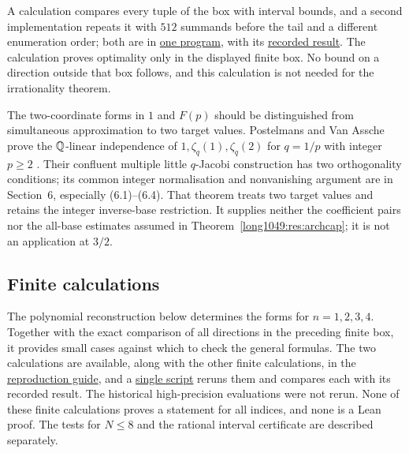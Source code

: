 \documentclass[11pt]{article}
\begin{document}
A calculation compares every tuple of the box with interval bounds,
and a second implementation repeats it with $512$ summands before the
tail and a different enumeration order; both are in
\href{https://github.com/wcook04/plectis-erdos/blob/4beca4ad0c00a626def9c73f2420e20ebf8d1968/research/experiments/erdos1049/parameter_box.py}{one program}, with its \href{https://github.com/wcook04/plectis-erdos/blob/4beca4ad0c00a626def9c73f2420e20ebf8d1968/research/experiments/erdos1049/receipts/parameter-box.json}{recorded result}.
The calculation proves optimality only in the displayed finite box. No
bound on a direction outside that box follows, and this calculation
is not needed for the irrationality theorem.

The two-coordinate forms in $1$ and $F(p)$ should be distinguished
from simultaneous approximation to two target values. Postelmans and Van Assche prove the $\mathbb{Q}$-linear independence
of $1,\zeta_q(1),\zeta_q(2)$ for $q=1/p$ with integer $p\ge2$
\cite[Thm.~1.3, p.~3]{postelmansvanassche2007}.
Their confluent multiple little $q$-Jacobi construction has two
orthogonality conditions; its common integer normalisation and
nonvanishing argument are in Section~6, especially (6.1)--(6.4).
That theorem treats two target values and retains the integer
inverse-base restriction. It supplies neither the coefficient pairs
nor the all-base estimates assumed in Theorem~\ref{long1049:res:archcap};
it is not an application at $3/2$.

\subsection{Finite calculations}\label{long1049:sec:receipts}

The polynomial reconstruction below determines the forms for
$n=1,2,3,4$. Together with the exact comparison of all directions in
the preceding finite box, it provides small cases against which to
check the general formulas. The two calculations are available,
along with the other finite calculations, in the
\href{https://github.com/wcook04/plectis-erdos/blob/f5c9e560df38cd32e9b49473a409384aab00d9ae/research/experiments/erdos1049/README.md}{reproduction guide}, and a
\href{https://github.com/wcook04/plectis-erdos/blob/f5c9e560df38cd32e9b49473a409384aab00d9ae/research/experiments/erdos1049/replay.py}{single script}
reruns them and compares each with its recorded result. The historical
high-precision evaluations were not rerun. None of these finite
calculations proves a statement for all indices, and none is a Lean proof. The
tests for $N\le8$ and the rational interval certificate are described
separately.
\end{document}

